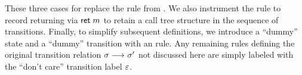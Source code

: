 \documentclass[10pt,reprint,nocopyrightspace,numbers]{sigplanconf}
\begin{document}
These three cases for \enkwForce{} replace the  rule from .
%
We also instrument the  rule to record returning via $\mathsf{ret}\;m$ to retain a call tree structure in the sequence of transitions.
%
Finally, to simplify subsequent definitions, we introduce a ``dummy'' \enkwInitial{} state and a ``dummy'' \enkwInit{} transition with an  rule.
%
%
Any remaining rules defining the original transition relation $\sigma \longrightarrow_{} \sigma'$ not discussed here are simply labeled with the ``don't care'' transition label $\varepsilon$.



\end{document}
